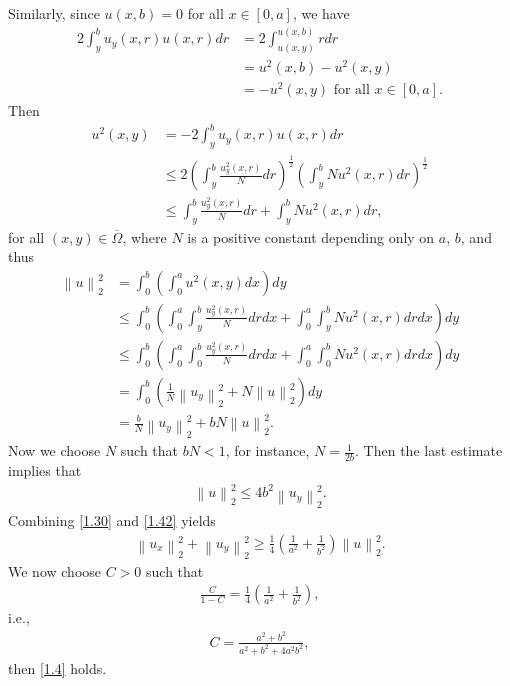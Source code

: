 \documentclass[11pt,a4paper]{article}
\numberwithin{equation}{section}
\numberwithin{equation}{section}
\begin{document}
\begin{enumerate}
Similarly, since $u\left(x,b\right)=0$ for all $x\in \left[0,a\right]$, we have
\begin{align}
2\int_y^b {{u_y}\left( {x,r} \right)u\left( {x,r} \right)dr} & = 2\int_{u\left( {x,y} \right)}^{u\left( {x,b} \right)} {rdr} \\
& = {u^2}\left( {x,b} \right) - {u^2}\left( {x,y} \right)\\
& =  - {u^2}\left( {x,y} \right) \mbox{ for all } x \in \left[ {0,a} \right].
\end{align}
Then
\begin{align}
{u^2}\left( {x,y} \right) &=  - 2\int_y^b {{u_y}\left( {x,r} \right)u\left( {x,r} \right)dr} \\
& \le 2{\left( {\int_y^b {\frac{{u_y^2\left( {x,r} \right)}}{N}dr} } \right)^{\frac{1}{2}}}{\left( {\int_y^b {N{u^2}\left( {x,r} \right)dr} } \right)^{\frac{1}{2}}}\\
& \le \int_y^b {\frac{{u_y^2\left( {x,r} \right)}}{N}dr}  + \int_y^b {N{u^2}\left( {x,r} \right)dr} ,
\end{align}
for all $\left(x,y\right) \in \overline \Omega$, where $N$ is a positive constant depending only on $a$, $b$, and thus
\begin{align}
\left\| u \right\|_2^2 &= \int_0^b {\left( {\int_0^a {{u^2}\left( {x,y} \right)dx} } \right)dy} \\
& \le \int_0^b {\left( {\int_0^a {\int_y^b {\frac{{u_y^2\left( {x,r} \right)}}{N}dr} dx}  + \int_0^a {\int_y^b {N{u^2}\left( {x,r} \right)dr} dx} } \right)dy} \\
& \le \int_0^b {\left( {\int_0^a {\int_0^b {\frac{{u_y^2\left( {x,r} \right)}}{N}dr} dx}  + \int_0^a {\int_0^b {N{u^2}\left( {x,r} \right)dr} dx} } \right)dy} \\
& = \int_0^b {\left( {\frac{1}{N}\left\| {{u_y}} \right\|_2^2 + N\left\| u \right\|_2^2} \right)dy} \\
& = \frac{b}{N}\left\| {{u_y}} \right\|_2^2 + bN\left\| u \right\|_2^2.
\end{align}
Now we choose $N$ such that $bN<1$, for instance, $N=\frac{1}{2b}$. Then the last estimate implies that 
\begin{align}
\label{1.42}
\left\| u \right\|_2^2 \le 4{b^2}\left\| {{u_y}} \right\|_2^2.
\end{align}
Combining \eqref{1.30} and \eqref{1.42} yields
\begin{align}
\left\| {{u_x}} \right\|_2^2 + \left\| {{u_y}} \right\|_2^2 \ge \frac{1}{4}\left( {\frac{1}{{{a^2}}} + \frac{1}{{{b^2}}}} \right)\left\| u \right\|_2^2.
\end{align}
We now choose $C>0$ such that 
\begin{align}
\frac{C}{{1 - C}} = \frac{1}{4}\left( {\frac{1}{{{a^2}}} + \frac{1}{{{b^2}}}} \right) ,
\end{align}
i.e., 
\begin{align}
C = \frac{{{a^2} + {b^2}}}{{{a^2} + {b^2} + 4{a^2}{b^2}}},
\end{align}
then \eqref{1.4} holds.


\end{enumerate}
\end{document}
